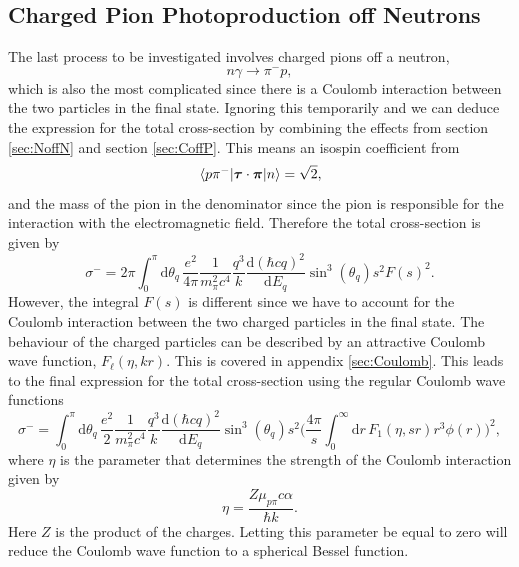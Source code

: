 \subsection{Charged Pion Photoproduction off Neutrons}
The last process to be investigated involves charged pions off a neutron,
\begin{equation} \label{proc4}
	n\gamma \rightarrow \pi^- p,
\end{equation}
which is also the most complicated since there is a Coulomb interaction between the two particles in the final state. Ignoring this temporarily and we can deduce the expression for the total cross-section by combining the effects from section \ref{sec:NoffN} and section \ref{sec:CoffP}. This means an isospin coefficient from
\begin{equation} \label{isoceffigen}
	\mel*{p\pi^-}{\bm{\mathrm{\tau}}\cdot\bm{\mathrm{\pi}}}{n} = \sqrt{2},
\end{equation}
and the mass of the pion in the denominator since the pion is responsible for the interaction with the electromagnetic field. Therefore the total cross-section is given by
\begin{equation} \label{totcross4}
	\sigma^- =  2\pi \int_0^\pi \text{d}\theta_q \, \frac{e^2}{4\pi}\frac{1}{m_\pi^2c^4}\frac{q^3}{k}\frac{\text{d}(\hbar c q)^2}{\text{d}E_q}\sin^3(\theta_q) s^2 F(s)^2.
\end{equation}
However, the integral $F(s)$ is different since we have to account for the Coulomb interaction between the two charged particles in the final state. The behaviour of the charged particles can be described by an attractive Coulomb	wave function, $F_\ell(\eta, kr)$. This is covered in appendix \ref{sec:Coulomb}. This leads to the final expression for the total cross-section using the regular Coulomb wave functions
\begin{equation} \label{totcross5}
	\sigma^- =  \int_0^\pi \text{d}\theta_q \, \frac{e^2}{2}\frac{1}{m_\pi^2c^4}\frac{q^3}{k}\frac{\text{d}(\hbar c q)^2}{\text{d}E_q}\sin^3(\theta_q) s^2 \bigg(\frac{4\pi}{s} \int_0^\infty \text{d}r \, F_1(\eta,sr)r^3\phi(r)\bigg)^2,
\end{equation}
where $\eta$ is the parameter that determines the strength of the Coulomb interaction given by
\begin{equation} \label{etafunc}
	\eta = \frac{Z\mu_{p\pi}c\alpha}{\hbar k}.
\end{equation}
Here $Z$ is the product of the charges. Letting this parameter be equal to zero will reduce the Coulomb wave function to a spherical Bessel function.